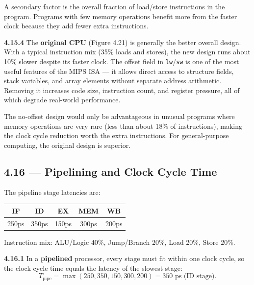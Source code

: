 A secondary factor is the overall fraction of load/store instructions in the
program. Programs with few memory operations benefit more from the faster
clock because they add fewer extra instructions.

\medskip\noindent\textbf{4.15.4}
The \textbf{original CPU} (Figure 4.21) is generally the better overall design.
With a typical instruction mix (35\% loads and stores), the new design runs
about 10\% slower despite its faster clock. The offset field in \texttt{lw}/\texttt{sw}
is one of the most useful features of the MIPS ISA --- it allows direct access
to structure fields, stack variables, and array elements without separate
address arithmetic. Removing it increases code size, instruction count, and
register pressure, all of which degrade real-world performance.

The no-offset design would only be advantageous in unusual programs where
memory operations are very rare (less than about 18\% of instructions), making
the clock cycle reduction worth the extra instructions. For general-purpose
computing, the original design is superior.
\subsection*{4.16 --- Pipelining and Clock Cycle Time}
\hypertarget{sol-4.16}{}

The pipeline stage latencies are:

\begin{center}
\begin{tabular}{ccccc}
\toprule
\textbf{IF} & \textbf{ID} & \textbf{EX} & \textbf{MEM} & \textbf{WB} \\
\midrule
250ps & 350ps & 150ps & 300ps & 200ps \\
\bottomrule
\end{tabular}
\end{center}

Instruction mix: ALU/Logic 40\%, Jump/Branch 20\%, Load 20\%, Store 20\%.

\medskip\noindent\textbf{4.16.1}
In a \textbf{pipelined} processor, every stage must fit within one clock cycle,
so the clock cycle time equals the latency of the slowest stage:
\[
  T_{\text{pipe}} = \max(250, 350, 150, 300, 200) = 350\text{ ps (ID stage).}
\]

